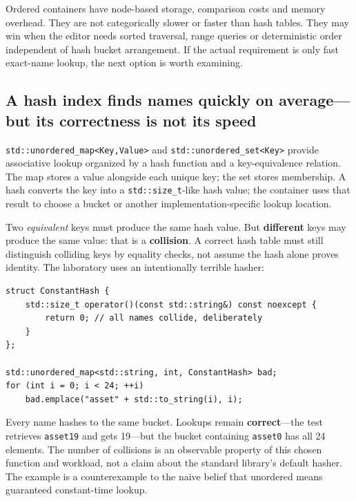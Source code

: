 Ordered containers have node-based storage, comparison costs and memory overhead. They are not categorically slower or faster than hash tables. They may win when the editor needs sorted traversal, range queries or deterministic order independent of hash bucket arrangement. If the actual requirement is only fast exact-name lookup, the next option is worth examining.

\subsection{A hash index finds names quickly on average---but its correctness is not its speed}\label{05-engine-i-ch005-a-hash-index-finds-names-quickly-on-averagebut-its-correctness-is-not-its-speed}

\texttt{std::unordered\_map\textless{}Key,Value\textgreater{}} and \texttt{std::unordered\_set\textless{}Key\textgreater{}} provide associative lookup organized by a hash function and a key-equivalence relation. The map stores a value alongside each unique key; the set stores membership. A hash converts the key into a \texttt{std::size\_t}-like hash value; the container uses that result to choose a bucket or another implementation-specific lookup location.

Two \emph{equivalent} keys must produce the same hash value. But \textbf{different} keys may produce the same value: that is a \textbf{collision}. A correct hash table must still distinguish colliding keys by equality checks, not assume the hash alone proves identity. The laboratory uses an intentionally terrible hasher:

\begin{verbatim}
struct ConstantHash {
    std::size_t operator()(const std::string&) const noexcept {
        return 0; // all names collide, deliberately
    }
};

std::unordered_map<std::string, int, ConstantHash> bad;
for (int i = 0; i < 24; ++i)
    bad.emplace("asset" + std::to_string(i), i);
\end{verbatim}

Every name hashes to the same bucket. Lookups remain \textbf{correct}---the test retrieves \texttt{asset19} and gets 19---but the bucket containing \texttt{asset0} has all 24 elements. The number of collisions is an observable property of this chosen function and workload, not a claim about the standard library's default hasher. The example is a counterexample to the naive belief that unordered means guaranteed constant-time lookup.

